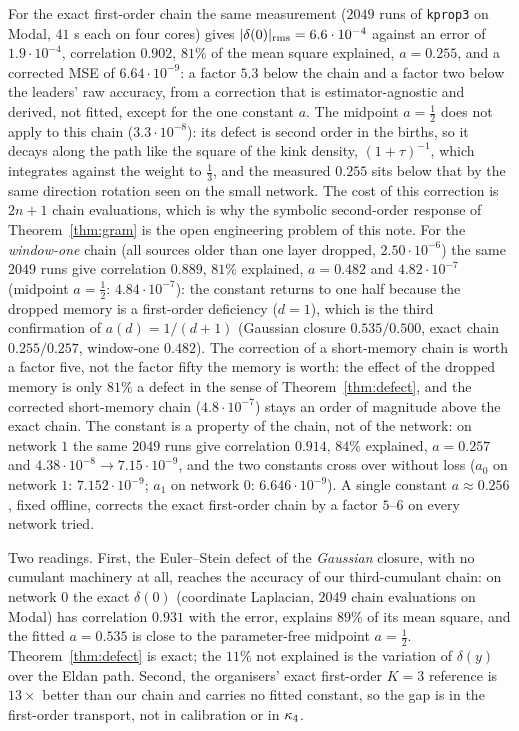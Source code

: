 For the exact first-order chain the same measurement ($2049$ runs of \texttt{kprop3} on Modal, $41$ s each on four
cores) gives $|\delta(0)|_{\rm rms}=6.6\cdot10^{-4}$ against an error of $1.9\cdot10^{-4}$, correlation $0.902$, $81\%$ of
the mean square explained, $a=0.255$, and a corrected MSE of $6.64\cdot10^{-9}$: a factor $5.3$ below the chain and
a factor two below the leaders' raw accuracy, from a correction that is estimator-agnostic and derived, not fitted,
except for the one constant $a$. The midpoint $a=\tfrac12$ does not apply to this chain ($3.3\cdot10^{-8}$): its
defect is second order in the births, so it decays along the path like the square of the kink density,
$(1+\tau)^{-1}$, which integrates against the weight to $\tfrac13$, and the measured $0.255$ sits below that by the
same direction rotation seen on the small network. The cost of this correction is $2n+1$ chain evaluations, which
is why the symbolic second-order response of Theorem~\ref{thm:gram} is the open engineering problem of this note.
For the \emph{window-one} chain (all sources older than one layer dropped, $2.50\cdot10^{-6}$) the same $2049$ runs give
correlation $0.889$, $81\%$ explained, $a=0.482$ and $4.82\cdot10^{-7}$ (midpoint $a=\tfrac12$: $4.84\cdot10^{-7}$): the
constant returns to one half because the dropped memory is a first-order deficiency ($d=1$), which is the third
confirmation of $a(d)=1/(d+1)$ (Gaussian closure $0.535/0.500$, exact chain $0.255/0.257$, window-one $0.482$). The
correction of a short-memory chain is worth a factor five, not the factor fifty the memory is worth: the effect
of the dropped memory is only $81\%$ a defect in the sense of Theorem~\ref{thm:defect}, and the corrected
short-memory chain ($4.8\cdot10^{-7}$) stays an order of magnitude above the exact chain.
The constant is a property of the chain, not of the network: on network $1$ the same $2049$ runs give
correlation $0.914$, $84\%$ explained, $a=0.257$ and $4.38\cdot10^{-8}\to7.15\cdot10^{-9}$, and the two constants
cross over without loss ($a_0$ on network $1$: $7.152\cdot10^{-9}$; $a_1$ on network $0$: $6.646\cdot10^{-9}$).
A single constant $a\approx0.256$, fixed offline, corrects the exact first-order chain by a factor $5$--$6$ on
every network tried.

Two readings. First, the Euler--Stein defect of the \emph{Gaussian} closure, with no cumulant machinery at all,
reaches the accuracy of our third-cumulant chain: on network $0$ the exact $\delta(0)$ (coordinate Laplacian,
$2049$ chain evaluations on Modal) has correlation $0.931$ with the error, explains $89\%$ of its mean square,
and the fitted $a=0.535$ is close to the parameter-free midpoint $a=\tfrac12$. Theorem~\ref{thm:defect} is
exact; the $11\%$ not explained is the variation of $\delta(y)$ over the Eldan path. Second, the organisers'
exact first-order $K=3$ reference is $13\times$ better than our chain and carries no fitted constant, so the
gap is in the first-order transport, not in calibration or in $\kappa_4$.


